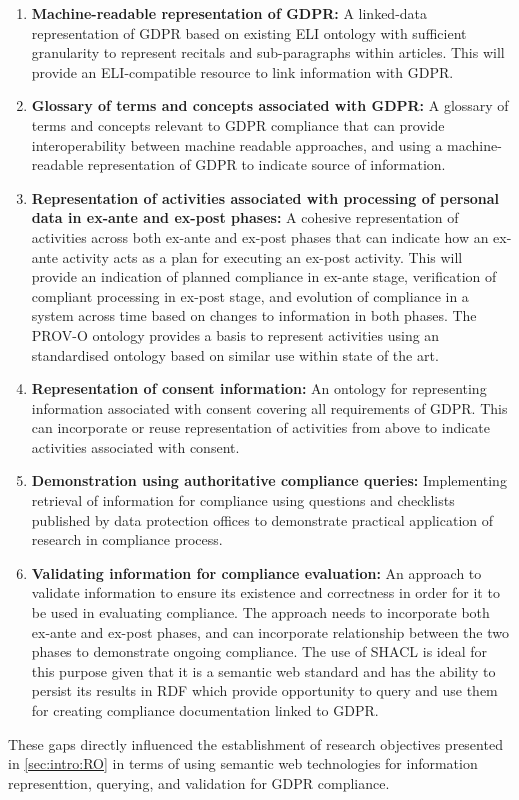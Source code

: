 \begin{enumerate}
\item \textbf{Machine-readable representation of GDPR:} A linked-data representation of GDPR based on existing ELI ontology with sufficient granularity to represent recitals and sub-paragraphs within articles. This will provide an ELI-compatible resource to link information with GDPR.
\item \textbf{Glossary of terms and concepts associated with GDPR:} A glossary of terms and concepts relevant to GDPR compliance that can provide interoperability between machine readable approaches, and using a machine-readable representation of GDPR to indicate source of information.
\item \textbf{Representation of activities associated with processing of personal data in ex-ante and ex-post phases:} A cohesive representation of activities across both ex-ante and ex-post phases that can indicate how an ex-ante activity acts as a plan for executing an ex-post activity. This will provide an indication of planned compliance in ex-ante stage, verification of compliant processing in ex-post stage, and evolution of compliance in a system across time based on changes to information in both phases. The PROV-O ontology provides a basis to represent activities using an standardised ontology based on similar use within state of the art.
\item \textbf{Representation of consent information:} An ontology for representing information associated with consent covering all requirements of GDPR. This can incorporate or reuse representation of activities from above to indicate activities associated with consent.
\item \textbf{Demonstration using authoritative compliance queries:} Implementing retrieval of information for compliance using questions and checklists published by data protection offices to demonstrate practical application of research in compliance process.
\item \textbf{Validating information for compliance evaluation:} An approach to validate information to ensure its existence and correctness in order for it to be used in evaluating compliance. The approach needs to incorporate both ex-ante and ex-post phases, and can incorporate relationship between the two phases to demonstrate ongoing compliance. The use of SHACL is ideal for this purpose given that it is a semantic web standard and has the ability to persist its results in RDF which provide opportunity to query and use them for creating compliance documentation linked to GDPR.
\end{enumerate}
These gaps directly influenced the establishment of research objectives presented in \autoref{sec:intro:RO} in terms of using semantic web technologies for information representtion, querying, and validation for GDPR compliance.
